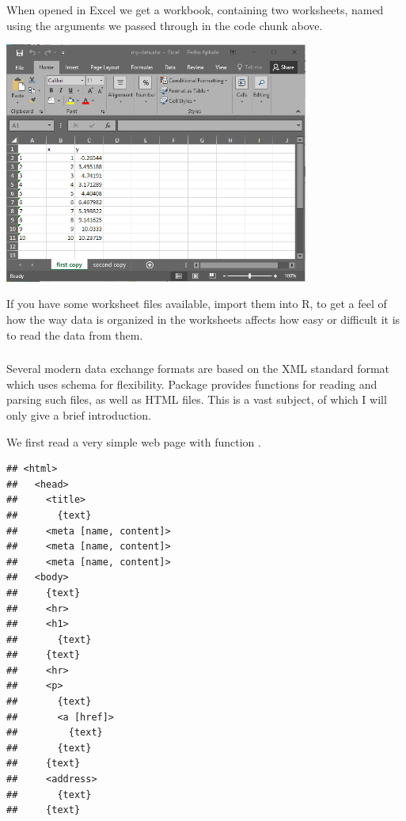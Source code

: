\documentclass[krantz2,ChapterTOCs]{krantz}\usepackage{knitr}
\begin{document}
When opened in Excel we get a workbook, containing two worksheets, named using the arguments we passed through  in the code chunk above.
\begin{center}
\includegraphics[width=0.75\textwidth]{figures/my-data-xlsx.png}
\end{center}

\begin{playground}
If you have some worksheet files available, import them into R, to get a feel of how the way data is organized in the worksheets affects how easy or difficult it is to read the data from them.
\end{playground}

\subsubsection['xml2']{}

Several modern data exchange formats are based on the XML standard format which uses schema for flexibility. Package  provides functions for reading and parsing such files, as well as HTML files. This is a vast subject, of which I will only give a brief introduction.

We first read a very simple web page with function .

\begin{knitrout}\footnotesize
{}\color{fgcolor}\begin{kframe}
\begin{alltt}
 \hlkwb{<-} \hlstd{(}\hlstd{)}
\end{alltt}
\begin{verbatim}
## <html>
##   <head>
##     <title>
##       {text}
##     <meta [name, content]>
##     <meta [name, content]>
##     <meta [name, content]>
##   <body>
##     {text}
##     <hr>
##     <h1>
##       {text}
##     {text}
##     <hr>
##     <p>
##       {text}
##       <a [href]>
##         {text}
##       {text}
##     {text}
##     <address>
##       {text}
##     {text}
\end{verbatim}
\end{kframe}
\end{knitrout}
\end{document}

